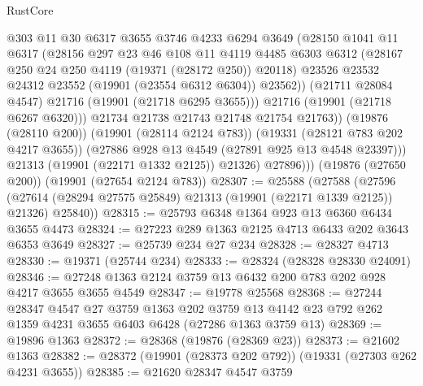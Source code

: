 \begin{lexlean}{RustCore}
\begin{coremodule}
                      @303
                      @11
                      @30
                      @6317
                      @3655
                      @3746
                      @4233
                      @6294
                      @3649
                      (@28150
                        @1041
                        @11
                        @6317
                        (@28156
                          @297
                          @23
                          @46
                          @108
                          @11
                          @4119
                          @4485
                          @6303
                          @6312
                          (@28167 @250 @24 @250 @4119 (@19371 (@28172 @250)) @20118)
                          @23526
                          @23532
                          @24312
                          @23552
                          (@19901 (@23554 @6312 @6304))
                          @23562))
                      (@21711 @28084 @4547)
                      @21716
                      (@19901 (@21718 @6295 @3655)))
                    @21716
                    (@19901 (@21718 @6267 @6320)))
                  @21734
                  @21738
                  @21743
                  @21748
                  @21754
                  @21763))
              (@19876 (@28110 @200))
              (@19901 (@28114 @2124 @783))
              (@19331 (@28121 @783 @202 @4217 @3655))
              (@27886 @928 @13 @4549 (@27891 @925 @13 @4548 @23397)))
            @21313
            (@19901 (@22171 @1332 @2125))
            @21326)
          @27896)))
    (@19876 (@27650 @200))
    (@19901 (@27654 @2124 @783))
@28307 := @25588
    (@27588
      (@27596 (@27614 (@28294 @27575 @25849) @21313 (@19901 (@22171 @1339 @2125)) @21326) @25840))
@28315 := @25793 @6348 @1364 @923 @13 @6360 @6434 @3655 @4473
@28324 := @27223 @289 @1363 @2125 @4713 @6433 @202 @3643 @6353 @3649
@28327 := @25739 @234 @27 @234
@28328 := @28327 @4713
@28330 := @19371 (@25744 @234)
@28333 := @28324 (@28328 @28330 @24091)
@28346 := @27248 @1363 @2124 @3759 @13 @6432 @200 @783 @202 @928 @4217 @3655 @3655 @4549
@28347 := @19778 @25568
@28368 := @27244
    @28347
    @4547
    @27
    @3759
    @1363
    @202
    @3759
    @13
    @4142
    @23
    @792
    @262
    @1359
    @4231
    @3655
    @6403
    @6428
    (@27286 @1363 @3759 @13)
@28369 := @19896 @1363
@28372 := @28368 (@19876 (@28369 @23))
@28373 := @21602 @1363
@28382 := @28372 (@19901 (@28373 @202 @792)) (@19331 (@27303 @262 @4231 @3655))
@28385 := @21620 @28347 @4547 @3759

\end{coremodule}
\end{lexlean}
